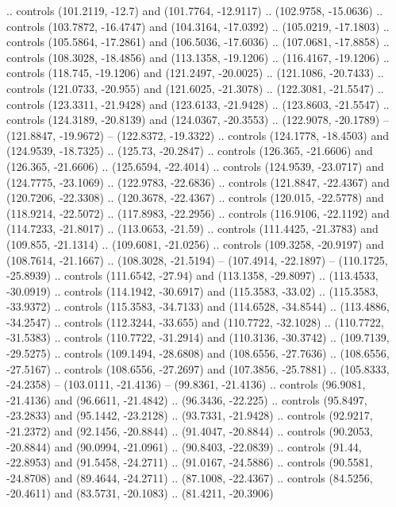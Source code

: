 {  .. controls (101.2119, -12.7) and (101.7764, -12.9117) .. (102.9758, -15.0636)
  .. controls (103.7872, -16.4747) and (104.3164, -17.0392) .. (105.0219, -17.1803)
  .. controls (105.5864, -17.2861) and (106.5036, -17.6036) .. (107.0681, -17.8858)
  .. controls (108.3028, -18.4856) and (113.1358, -19.1206) .. (116.4167, -19.1206)
  .. controls (118.745, -19.1206) and (121.2497, -20.0025) .. (121.1086, -20.7433)
  .. controls (121.0733, -20.955) and (121.6025, -21.3078) .. (122.3081, -21.5547)
  .. controls (123.3311, -21.9428) and (123.6133, -21.9428) .. (123.8603, -21.5547)
  .. controls (124.3189, -20.8139) and (124.0367, -20.3553) .. (122.9078, -20.1789)
  -- (121.8847, -19.9672)
  -- (122.8372, -19.3322)
  .. controls (124.1778, -18.4503) and (124.9539, -18.7325) .. (125.73, -20.2847)
  .. controls (126.365, -21.6606) and (126.365, -21.6606) .. (125.6594, -22.4014)
  .. controls (124.9539, -23.0717) and (124.7775, -23.1069) .. (122.9783, -22.6836)
  .. controls (121.8847, -22.4367) and (120.7206, -22.3308) .. (120.3678, -22.4367)
  .. controls (120.015, -22.5778) and (118.9214, -22.5072) .. (117.8983, -22.2956)
  .. controls (116.9106, -22.1192) and (114.7233, -21.8017) .. (113.0653, -21.59)
  .. controls (111.4425, -21.3783) and (109.855, -21.1314) .. (109.6081, -21.0256)
  .. controls (109.3258, -20.9197) and (108.7614, -21.1667) .. (108.3028, -21.5194)
  -- (107.4914, -22.1897)
  -- (110.1725, -25.8939)
  .. controls (111.6542, -27.94) and (113.1358, -29.8097) .. (113.4533, -30.0919)
  .. controls (114.1942, -30.6917) and (115.3583, -33.02) .. (115.3583, -33.9372)
  .. controls (115.3583, -34.7133) and (114.6528, -34.8544) .. (113.4886, -34.2547)
  .. controls (112.3244, -33.655) and (110.7722, -32.1028) .. (110.7722, -31.5383)
  .. controls (110.7722, -31.2914) and (110.3136, -30.3742) .. (109.7139, -29.5275)
  .. controls (109.1494, -28.6808) and (108.6556, -27.7636) .. (108.6556, -27.5167)
  .. controls (108.6556, -27.2697) and (107.3856, -25.7881) .. (105.8333, -24.2358)
  -- (103.0111, -21.4136)
  -- (99.8361, -21.4136)
  .. controls (96.9081, -21.4136) and (96.6611, -21.4842) .. (96.3436, -22.225)
  .. controls (95.8497, -23.2833) and (95.1442, -23.2128) .. (93.7331, -21.9428)
  .. controls (92.9217, -21.2372) and (92.1456, -20.8844) .. (91.4047, -20.8844)
  .. controls (90.2053, -20.8844) and (90.0994, -21.0961) .. (90.8403, -22.0839)
  .. controls (91.44, -22.8953) and (91.5458, -24.2711) .. (91.0167, -24.5886)
  .. controls (90.5581, -24.8708) and (89.4644, -24.2711) .. (87.1008, -22.4367)
  .. controls (84.5256, -20.4611) and (83.5731, -20.1083) .. (81.4211, -20.3906)
}
